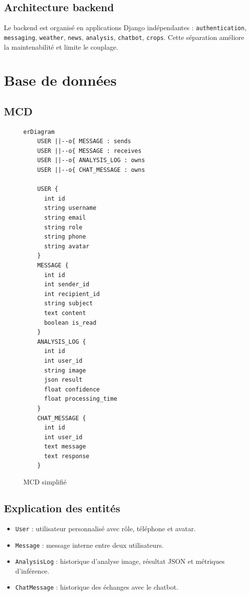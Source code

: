 \subsection{Architecture backend}
Le backend est organisé en applications Django indépendantes :
\texttt{authentication}, \texttt{messaging}, \texttt{weather}, \texttt{news}, \texttt{analysis}, \texttt{chatbot}, \texttt{crops}. Cette séparation améliore la maintenabilité et limite le couplage.

\section{Base de données}
\subsection{MCD}
\begin{figure}[H]
\centering
\caption{MCD simplifié}
\begin{lstlisting}[language=mermaid]
erDiagram
    USER ||--o{ MESSAGE : sends
    USER ||--o{ MESSAGE : receives
    USER ||--o{ ANALYSIS_LOG : owns
    USER ||--o{ CHAT_MESSAGE : owns

    USER {
      int id
      string username
      string email
      string role
      string phone
      string avatar
    }
    MESSAGE {
      int id
      int sender_id
      int recipient_id
      string subject
      text content
      boolean is_read
    }
    ANALYSIS_LOG {
      int id
      int user_id
      string image
      json result
      float confidence
      float processing_time
    }
    CHAT_MESSAGE {
      int id
      int user_id
      text message
      text response
    }
\end{lstlisting}
\end{figure}

\subsection{Explication des entités}
\begin{itemize}[noitemsep]
  \item \texttt{User} : utilisateur personnalisé avec rôle, téléphone et avatar.
  \item \texttt{Message} : message interne entre deux utilisateurs.
  \item \texttt{AnalysisLog} : historique d'analyse image, résultat JSON et métriques d'inférence.
  \item \texttt{ChatMessage} : historique des échanges avec le chatbot.
\end{itemize}

